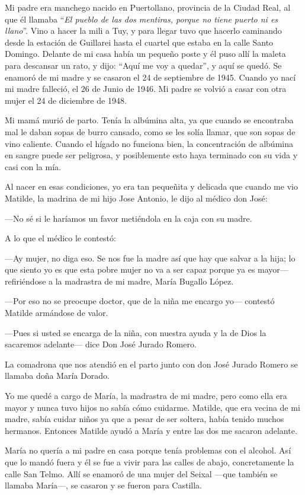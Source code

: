 \documentclass[12pt,a5paper]{book}
\begin{document}
Mi padre era manchego nacido en Puertollano, provincia de la Ciudad Real, al que él llamaba ``\textit{El pueblo de las dos mentiras, porque no tiene puerto ni es llano}''. Vino a hacer la mili a Tuy, y para llegar tuvo que hacerlo caminando desde la estación de Guillarei hasta el cuartel que estaba en la calle Santo Domingo. Delante de mi casa había un pequeño poste y él puso allí la maleta para descansar un rato, y dijo: “Aquí me voy a  quedar”, y aquí se quedó. Se enamoró de mi madre y se casaron el 24 de septiembre de 1945. Cuando yo nací mi madre falleció, el 26 de Junio de 1946. Mi padre se volvió a casar con otra mujer el 24 de diciembre de 1948.

Mi mamá murió de parto. Tenía la albúmina alta, ya que cuando se encontraba mal le daban sopas de burro cansado, como se les solía llamar, que son sopas de vino caliente. Cuando el hígado no funciona bien, la concentración de albúmina en sangre puede ser peligrosa, y posiblemente esto haya terminado con su vida y casi con la mía.

Al nacer en esas condiciones, yo era tan pequeñita y delicada que cuando me vio Matilde, la madrina de mi hijo Jose Antonio, le dijo al médico don José:

---No sé si le haríamos un favor metiéndola en la caja con su madre.

A lo que el médico le contestó:

---Ay mujer, no diga eso. Se nos fue la madre así que hay que salvar a la hija; lo que siento yo es que esta pobre mujer no va a ser capaz porque ya es mayor--- refiriéndose a la madrastra de mi madre, María Bugallo López.

---Por eso no se preocupe doctor, que de la niña me encargo yo--- contestó Matilde armándose de valor.

---Pues si usted se encarga de la niña, con nuestra ayuda y la de Dios la sacaremos adelante--- dice Don José Jurado Romero.

La comadrona que nos atendió en el parto junto con don José Jurado Romero se llamaba doña María Dorado.

Yo me quedé a cargo de María, la madrastra de mi madre, pero como ella era mayor y nunca tuvo hijos no sabía cómo cuidarme. Matilde, que era vecina de mi madre, sabía cuidar niños ya que a pesar de ser soltera, había tenido muchos hermanos. Entonces Matilde ayudó a María y entre las dos me sacaron adelante.

María no quería a mi padre en casa porque tenía problemas con el alcohol. Así que lo mandó fuera y él se fue a vivir para las calles de abajo, concretamente la calle San Telmo. Allí se enamoró de una mujer del Seixal ---que también se llamaba María---, se casaron y se fueron para Castilla.
\end{document}
